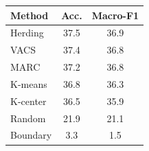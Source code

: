 \begin{tabular}{lcc}
\toprule
Method & Acc. & Macro-F1 \\
\midrule
Herding & 37.5 & 36.9 \\
VACS & 37.4 & 36.8 \\
MARC & 37.2 & 36.8 \\
K-means & 36.8 & 36.3 \\
K-center & 36.5 & 35.9 \\
Random & 21.9 & 21.1 \\
Boundary & 3.3 & 1.5 \\
\bottomrule
\end{tabular}

